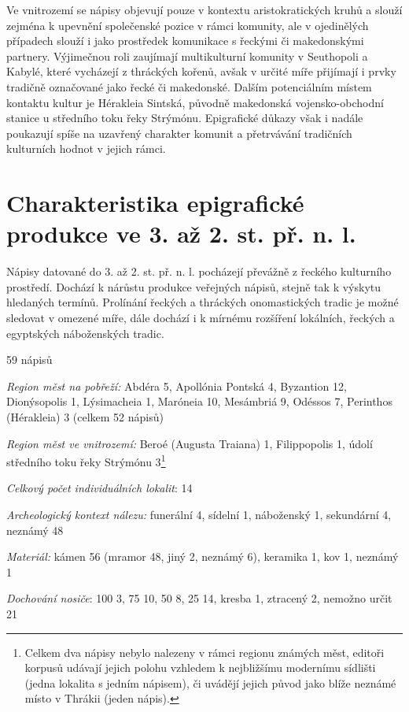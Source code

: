 Ve vnitrozemí se nápisy objevují pouze v kontextu aristokratických kruhů a slouží zejména k upevnění společenské pozice v rámci komunity, ale v ojedinělých případech slouží i jako prostředek komunikace s řeckými či makedonskými partnery. Výjimečnou roli zaujímají multikulturní komunity v Seuthopoli a Kabylé, které vycházejí z thráckých kořenů, avšak v určité míře přijímají i prvky tradičně označované jako řecké či makedonské. Dalším potenciálním místem kontaktu kultur je Hérakleia Sintská, původně makedonská vojensko-obchodní stanice u středního toku řeky Strýmónu. Epigrafické důkazy však i nadále poukazují spíše na uzavřený charakter komunit a přetrvávání tradičních kulturních hodnot v jejich rámci.

\section[charakteristika-epigrafické-produkce-ve-3.-až-2.-st.-př.-n.-l.]{Charakteristika epigrafické produkce ve 3. až 2. st. př. n. l.}

Nápisy datované do 3. až 2. st. př. n. l. pocházejí převážně z řeckého kulturního prostředí. Dochází k nárůstu produkce veřejných nápisů, stejně tak k výskytu hledaných termínů. Prolínání řeckých a thráckých onomastických tradic je možné sledovat v omezené míře, dále dochází i k mírnému rozšíření lokálních, řeckých a egyptských náboženských tradic.

\placetable[none]{}
\starttable[|l|]
\HL
{} 59 nápisů

{\em Region měst na pobřeží:} Abdéra 5, Apollónia Pontská 4, Byzantion 12, Dionýsopolis 1, Lýsimacheia 1, Maróneia 10, Mesámbriá 9, Odéssos 7, Perinthos (Hérakleia) 3 (celkem 52 nápisů)

{\em Region měst ve vnitrozemí:} Beroé (Augusta Traiana) 1, Filippopolis 1, údolí středního toku řeky Strýmónu 3\footnote{Celkem dva nápisy nebylo nalezeny v rámci regionu známých měst, editoři korpusů udávají jejich polohu vzhledem k nejbližšímu modernímu sídlišti (jedna lokalita s jedním nápisem), či uvádějí jejich původ jako blíže neznámé místo v Thrákii (jeden nápis).}

{\em Celkový počet individuálních lokalit}: 14

{\em Archeologický kontext nálezu:} funerální 4, sídelní 1, náboženský 1, sekundární 4, neznámý 48

{\em Materiál:} kámen 56 (mramor 48, jiný 2, neznámý 6), keramika 1, kov 1, neznámý 1

{\em Dochování nosiče}: 100  3, 75  10, 50  8, 25  14, kresba 1, ztracený 2, nemožno určit 21

